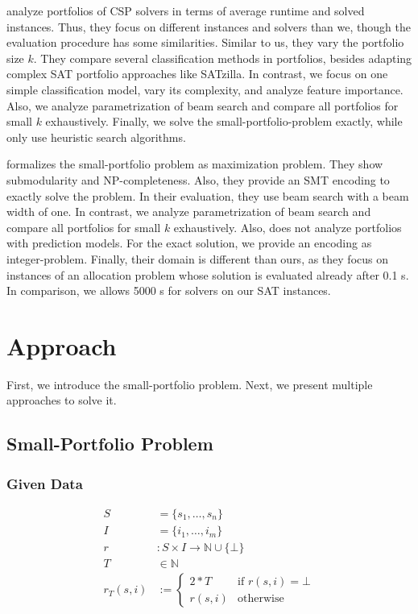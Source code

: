 \documentclass[conference]{IEEEtran}
\begin{document}
\cite{amadini2014empirical, amadini2016extensive} analyze portfolios of CSP solvers in terms of average runtime and solved instances.
Thus, they focus on different instances and solvers than we, though the evaluation procedure has some similarities.
Similar to us, they vary the portfolio size $k$.
They compare several classification methods in portfolios, besides adapting complex SAT portfolio approaches like SATzilla.
In contrast, we focus on one simple classification model, vary its complexity, and analyze feature importance.
Also, we analyze parametrization of beam search and compare all portfolios for small $k$ exhaustively.
Finally, we solve the small-portfolio-problem exactly, while \cite{amadini2014empirical} only use heuristic search algorithms.

\cite{nof2020real} formalizes the small-portfolio problem as maximization problem.
They show submodularity and NP-completeness.
Also, they provide an SMT encoding to exactly solve the problem.
In their evaluation, they use beam search with a beam width of one.
In contrast, we analyze parametrization of beam search and compare all portfolios for small $k$ exhaustively.
Also, \cite{nof2020real} does not analyze portfolios with prediction models.
For the exact solution, we provide an encoding as integer-problem.
Finally, their domain is different than ours, as they focus on instances of an allocation problem whose solution is evaluated already after 0.1 s.
In comparison, we allows 5000 s for solvers on our SAT instances.

\section{Approach}
\label{sec:approach}

First, we introduce the small-portfolio problem.
Next, we present multiple approaches to solve it.

\subsection{Small-Portfolio Problem}

\subsubsection{Given Data}
\label{sec:approach:problem:data}

\begin{align*}
	S &= \{s_1, \dots, s_n\} \tag*{Solvers}\\
	I &= \{i_1, \dots, i_m\} \tag*{Instances}\\
	r &: S \times I \rightarrow \mathbb{N} \cup \{\bot\} \tag*{Runtimes (censored)}\\
	T &\in \mathbb{N} \tag*{Timeout}\\
	r_T(s,i) &:= \begin{cases}
		2*T & \text{if }r(s,i) = \bot\\
		r(s,i) & \text{otherwise}
	\end{cases} \tag*{Penalized Runtimes}
\end{align*}
\end{document}
